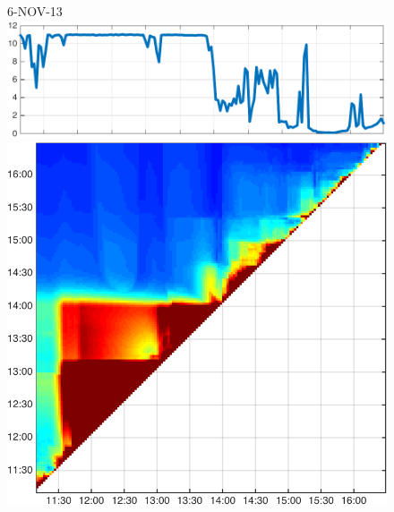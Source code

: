 \begin{figure}
\begin{minipage}[c]{\mylength}
\end{minipage}
\begin{minipage}[c]{\mylength}
\centering \scriptsize 6-NOV-13 \\
\includegraphics[valign=t,trim=0 0 5pt 0,angle=90,origin=tr,width=\sunintwidth,totalheight=\eventheight]{events/20131106-intensity.pdf}
\includegraphics[valign=t,width=\eventswidth]{events/20131106-maxGain-local-events.png}

\end{minipage}
\end{figure}

